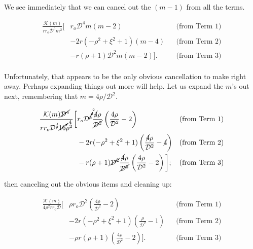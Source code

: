 \noindent We see immediately that we can cancel out the \((m-1)\) from all the terms.

\begin{equation}
    \begin{aligned}
        \frac{\mathcal{K}(m)}{rr_o\mathcal{D}^5m^2} \bigg[&  r_o\mathcal{D}^4m(m-2)  && \text{(from Term 1)} \\
      &- 2r(-\rho^2+\xi^2+1)(m-4) && \text{(from Term 2)} \\
      &- r(\rho+1)\mathcal{D}^2m(m-2) \bigg]. && \text{(from Term 3)} \\
    \end{aligned}
\end{equation}

\noindent Unfortunately, that appears to be the only obvious cancellation to make right away.
%
Perhaps expanding things out more will help.
%
Let us expand the \(m\)'s out next, remembering that \(m=4\rho/\mathcal{D}^2\).

\begin{equation}
    \begin{aligned}
        \frac{\mathcal{K}(m)\cancel{\mathcal{D}^4}}{rr_o\mathcal{D}^{\cancel{5}} \cancelto{4}{16}\rho^2} \bigg[&  r_o\mathcal{D}^{\cancelto{2}{4}}\frac{\cancel{4}\rho}{\cancel{\mathcal{D}^2}}\left(\frac{4\rho}{\mathcal{D}^2}-2\right)  && \text{(from Term 1)} \\
        &- 2r(-\rho^2+\xi^2+1)\left(\frac{\cancel{4}\rho}{\mathcal{D}^2}-\cancel{4}\right) && \text{(from Term 2)} \\
        &- r(\rho+1)\cancel{\mathcal{D}^2}\frac{\cancel{4}\rho}{\cancel{\mathcal{D}^2}}\left(\frac{4\rho}{\mathcal{D}^2}-2\right) \bigg]; && \text{(from Term 3)} \\
    \end{aligned}
\end{equation}

\noindent then canceling out the obvious items and cleaning up:

\begin{equation}
    \begin{aligned}
        \frac{\mathcal{K}(m)}{4\rho^2 rr_o\mathcal{D} } \bigg[&  \rho r_o\mathcal{D}^2\left(\frac{4\rho}{\mathcal{D}^2}-2\right)  && \text{(from Term 1)} \\
      &- 2r(-\rho^2+\xi^2+1)\left(\frac{\rho}{\mathcal{D}^2}-1\right) && \text{(from Term 2)} \\
      &- \rho r(\rho+1)\left(\frac{4\rho}{\mathcal{D}^2}-2\right) \bigg]. && \text{(from Term 3)} \\
    \end{aligned}
\end{equation}

